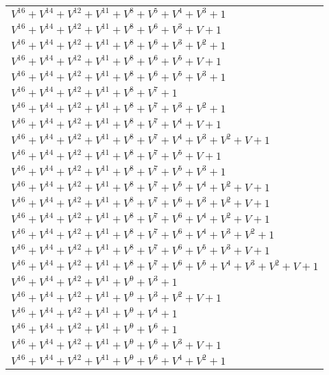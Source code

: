 \documentclass[12pt]{article}
\begin{document}
\begin{adjustwidth}{-4cm}{}
\begin{center}
\begin{longtable}{|l|}
$V^{16}  +V^{14}  +V^{12}  +V^{11}  +V^{8}  +V^{5}  +V^{4}  +V^{3}  + 1$ \\
$V^{16}  +V^{14}  +V^{12}  +V^{11}  +V^{8}  +V^{6}  +V^{3}  + V + 1$ \\
$V^{16}  +V^{14}  +V^{12}  +V^{11}  +V^{8}  +V^{6}  +V^{3}  +V^{2}  + 1$ \\
$V^{16}  +V^{14}  +V^{12}  +V^{11}  +V^{8}  +V^{6}  +V^{5}  + V + 1$ \\
$V^{16}  +V^{14}  +V^{12}  +V^{11}  +V^{8}  +V^{6}  +V^{5}  +V^{3}  + 1$ \\
$V^{16}  +V^{14}  +V^{12}  +V^{11}  +V^{8}  +V^{7}  + 1$ \\
$V^{16}  +V^{14}  +V^{12}  +V^{11}  +V^{8}  +V^{7}  +V^{3}  +V^{2}  + 1$ \\
$V^{16}  +V^{14}  +V^{12}  +V^{11}  +V^{8}  +V^{7}  +V^{4}  + V + 1$ \\
$V^{16}  +V^{14}  +V^{12}  +V^{11}  +V^{8}  +V^{7}  +V^{4}  +V^{3}  +V^{2}  + V + 1$ \\
$V^{16}  +V^{14}  +V^{12}  +V^{11}  +V^{8}  +V^{7}  +V^{5}  + V + 1$ \\
$V^{16}  +V^{14}  +V^{12}  +V^{11}  +V^{8}  +V^{7}  +V^{5}  +V^{3}  + 1$ \\
$V^{16}  +V^{14}  +V^{12}  +V^{11}  +V^{8}  +V^{7}  +V^{5}  +V^{4}  +V^{2}  + V + 1$ \\
$V^{16}  +V^{14}  +V^{12}  +V^{11}  +V^{8}  +V^{7}  +V^{6}  +V^{3}  +V^{2}  + V + 1$ \\
$V^{16}  +V^{14}  +V^{12}  +V^{11}  +V^{8}  +V^{7}  +V^{6}  +V^{4}  +V^{2}  + V + 1$ \\
$V^{16}  +V^{14}  +V^{12}  +V^{11}  +V^{8}  +V^{7}  +V^{6}  +V^{4}  +V^{3}  +V^{2}  + 1$ \\
$V^{16}  +V^{14}  +V^{12}  +V^{11}  +V^{8}  +V^{7}  +V^{6}  +V^{5}  +V^{3}  + V + 1$ \\
$V^{16}  +V^{14}  +V^{12}  +V^{11}  +V^{8}  +V^{7}  +V^{6}  +V^{5}  +V^{4}  +V^{3}  +V^{2}  + V + 1$ \\
$V^{16}  +V^{14}  +V^{12}  +V^{11}  +V^{9}  +V^{3}  + 1$ \\
$V^{16}  +V^{14}  +V^{12}  +V^{11}  +V^{9}  +V^{3}  +V^{2}  + V + 1$ \\
$V^{16}  +V^{14}  +V^{12}  +V^{11}  +V^{9}  +V^{4}  + 1$ \\
$V^{16}  +V^{14}  +V^{12}  +V^{11}  +V^{9}  +V^{6}  + 1$ \\
$V^{16}  +V^{14}  +V^{12}  +V^{11}  +V^{9}  +V^{6}  +V^{3}  + V + 1$ \\
$V^{16}  +V^{14}  +V^{12}  +V^{11}  +V^{9}  +V^{6}  +V^{4}  +V^{2}  + 1$ \\

\end{longtable}
\end{center}
\end{adjustwidth}
\end{document}
